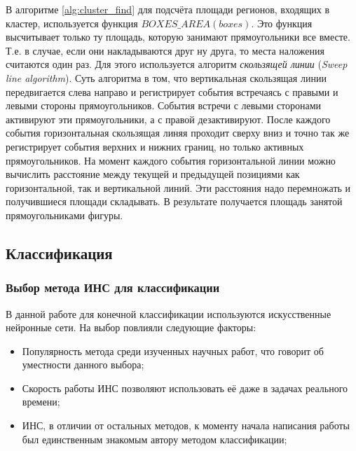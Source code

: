 \documentclass[12pt]{report}
\newenvironment{myItemize}{
 	\vspace{-10pt}
	\begin{itemize}[nolistsep]
}{\end{itemize}}
\begin{document}
В алгоритме \ref{alg:cluster_find}  для подсчёта площади регионов, входящих в кластер, используется функция $BOXES\_AREA(boxes)$. Это 
функция высчитывает только ту площадь, которую занимают прямоугольники все вместе. Т.е. в случае, если они 
накладываются друг ну друга, то места наложения считаются один раз. Для этого используется алгоритм \emph{скользящей линии} 
(\textit{Sweep line algorithm}). Суть алгоритма в том, что вертикальная скользящая линии передвигается слева 
направо 
и регистрирует события встречаясь с правыми и левыми стороны прямоугольников. События встречи с левыми сторонами 
активируют эти прямоугольники, а с правой дезактивируют. После каждого события горизонтальная скользящая линяя 
проходит сверху вниз и точно так же регистрирует события верхних и нижних границ, но только активных 
прямоугольников. 
На момент каждого события горизонтальной линии можно вычислить расстояние между текущей и предыдущей позициями как 
горизонтальной, так и вертикальной линий. Эти расстояния надо перемножать и получившиеся площади складывать. В 
результате получается площадь занятой прямоугольниками фигуры.


\subsection{Классификация}

\subsubsection{Выбор метода ИНС для классификации}
В данной работе для конечной классификации используются искусственные нейронные сети. На выбор повлияли следующие 
факторы:
\begin{myItemize}
\item Популярность метода среди изученных научных работ, что говорит об уместности данного выбора;
\item Скорость работы ИНС позволяют использовать её даже в задачах реального времени;
\item ИНС, в отличии от остальных методов, к моменту начала написания работы был единственным знакомым автору 
методом классификации;
\end{myItemize}
\end{document}
